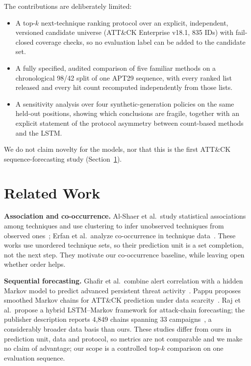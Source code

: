 \documentclass[conference]{IEEEtran}
\begin{document}
The contributions are deliberately limited:
\begin{itemize}
\item A top-$k$ next-technique ranking protocol over an explicit, independent, versioned candidate universe (ATT\&CK Enterprise v18.1, 835 IDs) with fail-closed coverage checks, so no evaluation label can be added to the candidate set.
\item A fully specified, audited comparison of five familiar methods on a chronological 98/42 split of one APT29 sequence, with every ranked list released and every hit count recomputed independently from those lists.
\item A sensitivity analysis over four synthetic-generation policies on the same held-out positions, showing which conclusions are fragile, together with an explicit statement of the protocol asymmetry between count-based methods and the LSTM.
\end{itemize}
We do not claim novelty for the models, nor that this is the first ATT\&CK sequence-forecasting study (Section~\ref{sec:related}).

\section{Related Work}
\label{sec:related}

\textbf{Association and co-occurrence.} Al-Shaer et al.\ study statistical associations among techniques and use clustering to infer unobserved techniques from observed ones~\cite{alshaer2020}; Erfan et al.\ analyze co-occurrence in technique data~\cite{erfan2026}. These works use unordered technique sets, so their prediction unit is a set completion, not the next step. They motivate our co-occurrence baseline, while leaving open whether order helps.

\textbf{Sequential forecasting.} Ghafir et al.\ combine alert correlation with a hidden Markov model to predict advanced persistent threat activity~\cite{ghafir2019}. Pappu proposes smoothed Markov chains for ATT\&CK prediction under data scarcity~\cite{pappu2025}. Raj et al.\ propose a hybrid LSTM--Markov framework for attack-chain forecasting; the publisher description reports 4,849 chains spanning 33 campaigns~\cite{raj2026}, a considerably broader data basis than ours. These studies differ from ours in prediction unit, data and protocol, so metrics are not comparable and we make no claim of advantage; our scope is a controlled top-$k$ comparison on one evaluation sequence.
\end{document}
